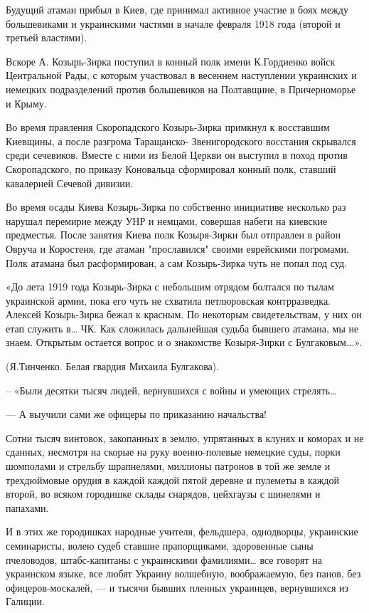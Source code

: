 Будущий атаман прибыл в Киев, где принимал активное участие в боях между
большевиками и украинскими частями в начале февраля 1918 года (второй и
третьей властями). 

Вскоре А. Козырь-Зирка поступил в конный полк имени К.Гордиенко войск
Центральной Рады, с которым участвовал в весеннем наступлении украинских и
немецких подразделений против большевиков на Полтавщине, в Причерноморье и
Крыму. 

Во время правления Скоропадского Козырь-Зирка примкнул к восставшим
Киевщины, а после разгрома Таращанско- Звенигородского восстания скрывался
среди сечевиков. Вместе с ними из Белой Церкви он выступил в поход против
Скоропадского, по приказу Коновальца сформировал конный полк, ставший
кавалерией Сечевой дивизии. 

Во время осады Киева Козырь-Зирка по собственно инициативе несколько раз
нарушал перемирие между УНР и немцами, совершая набеги на киевские
предместья. После занятия Киева полк Козыря-Зирки был отправлен в район
Овруча и Коростеня, где атаман "прославился" своими еврейскими погромами.
Полк атамана был расформирован, а сам Козырь-Зирка чуть не попал под суд. 

«До лета 1919 года Козырь-Зирка с небольшим отрядом болтался по тылам
украинской армии, пока его чуть не схватила петлюровская контрразведка.
Алексей Козырь-Зирка бежал к красным. По некоторым свидетельствам, у них
он етап служить в… ЧК. Как сложилась дальнейшая судьба бывшего атамана, мы
не знаем. Открытым остается вопрос и о знакомстве Козыря-Зирки с
Булгаковым...».

(Я.Тинченко. Белая гвардия Михаила Булгакова).

– «Были десятки тысяч людей, вернувшихся с войны и умеющих стрелять…

— А выучили сами же офицеры по приказанию начальства!

Сотни тысяч винтовок, закопанных в землю, упрятанных в клунях и коморах и не
сданных, несмотря на скорые на руку военно-полевые немецкие суды, порки
шомполами и стрельбу шрапнелями, миллионы патронов в той же земле и
трехдюймовые орудия в каждой каждой пятой деревне и пулеметы в каждой второй,
во всяком городишке склады снарядов, цейхгаузы с шинелями и папахами.

И в этих же городишках народные учителя, фельдшера, однодворцы, украинские
семинаристы, волею судеб ставшие прапорщиками, здоровенные сыны пчеловодов,
штабс-капитаны с украинскими фамилиями… все говорят на украинском языке, все
любят Украину волшебную, воображаемую, без панов, без офицеров-москалей, — и
тысячи бывших пленных украинцев, вернувшихся из Галиции.

